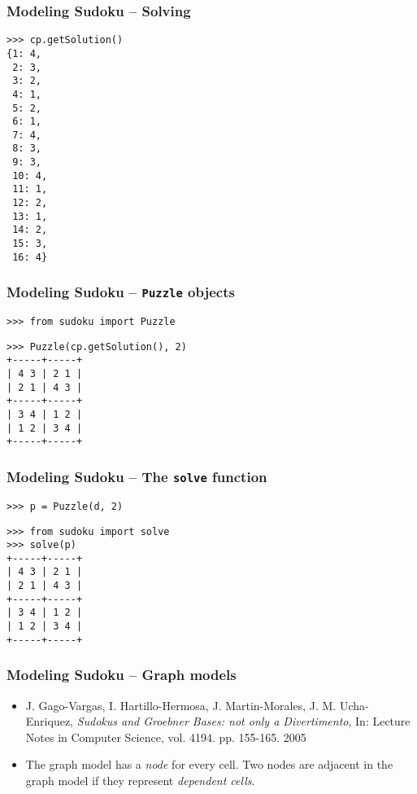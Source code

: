 \documentclass{beamer}
\begin{document}
\begin{frame}[fragile]
\frametitle{Modeling Sudoku -- Solving}
\begin{lstlisting}
>>> cp.getSolution() 
{1: 4,
 2: 3,
 3: 2,
 4: 1,
 5: 2,
 6: 1,
 7: 4,
 8: 3,
 9: 3,
 10: 4,
 11: 1,
 12: 2,
 13: 1,
 14: 2,
 15: 3,
 16: 4}
\end{lstlisting}
\end{frame}


\begin{frame}[fragile]
\frametitle{Modeling Sudoku -- \texttt{Puzzle} objects}
\begin{lstlisting}
>>> from sudoku import Puzzle
\end{lstlisting}
\pause
\begin{lstlisting}
>>> Puzzle(cp.getSolution(), 2)
+-----+-----+
| 4 3 | 2 1 | 
| 2 1 | 4 3 | 
+-----+-----+
| 3 4 | 1 2 | 
| 1 2 | 3 4 | 
+-----+-----+
\end{lstlisting}
\end{frame}

\begin{frame}[fragile]
\frametitle{Modeling Sudoku -- The \texttt{solve} function}

\begin{lstlisting}
>>> p = Puzzle(d, 2)
\end{lstlisting}

\pause

\begin{lstlisting}
>>> from sudoku import solve
>>> solve(p)
+-----+-----+
| 4 3 | 2 1 | 
| 2 1 | 4 3 | 
+-----+-----+
| 3 4 | 1 2 | 
| 1 2 | 3 4 | 
+-----+-----+
\end{lstlisting}

\end{frame}

\begin{frame}[fragile]
\frametitle{Modeling Sudoku -- Graph models}
\begin{itemize}
 \item J. Gago-Vargas, I. Hartillo-Hermosa, J. Martin-Morales, J. M. Ucha- Enriquez, \emph{Sudokus and Groebner Bases: not only a Divertimento}, In: Lecture Notes in Computer Science, vol. 4194. pp. 155-165. 2005
 \pause
 \item The graph model has a \emph{node} for every cell. Two nodes are adjacent in the graph model if they represent \emph{dependent cells}.
\end{itemize}
\end{frame}
\end{document}
